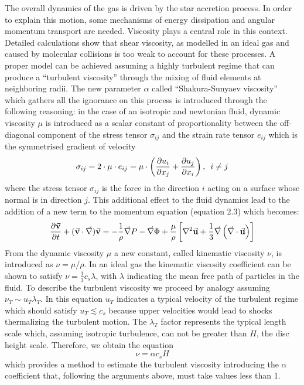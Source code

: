 \documentclass[a4paper,10pt]{report}
\begin{document}
The overall dynamics of the gas is driven by the star accretion process. In order to explain this motion, some mechanisms of energy dissipation and angular momentum transport
are needed. Viscosity plays a central role in this context. Detailed calculations show that shear viscosity, 
as modelled in an ideal gas and caused by molecular collisions is too weak to account for these processes. 
A proper model can be achieved assuming a highly turbulent regime that can produce a ``turbulent viscosity'' through the mixing of fluid elements
at neighboring radii. The new parameter $\alpha$
called ``Shakura-Sunyaev viscosity'' \citep{ssviscosity} which gathers all the ignorance on this process is introduced through the following reasoning:
in the case of an isotropic and newtonian fluid, dynamic viscosity $\mu$ is introduced as a scalar constant of 
proportionality between the off-diagonal component of the stress tensor $\sigma_{ij}$ and the strain rate tensor $e_{ij}$ which is the symmetrised gradient of velocity \citep{fluid}
\begin{equation}
    \sigma_{ij} = 2 \cdot \mu \cdot e_{ij} = \mu \cdot \left( \pdv{u_i}{x_j} + \pdv{u_j}{x_i} \right), \hspace{5pt} i \neq j
\end{equation}
where the stress tensor $\sigma_{ij}$ is the force in the direction $i$ acting on a surface whose
normal is in direction $j$.
This additional effect to the fluid dynamics lead to the addition of a new term to the momentum equation (equation 2.3) which becomes:
\begin{equation}
    \pdv{\va{v}}{t} + (\va{v}\cdot \va\nabla)\va{v} = -\frac{1}{\rho}\va  \nabla P - \va \nabla \Phi + \frac{\mu}{\rho}
    \left[ \nabla^2\va u + \frac 1 3 \va \nabla \left( \va \nabla \cdot \va u\right) \right]
\end{equation}
From the dynamic viscosity $\mu$ a new constant, called kinematic viscosity $\nu$, is introduced as $\nu=\mu/\rho$.
In an ideal gas the kinematic viscosity coefficient can be shown to satisfy $\nu = \frac{1}{3}c_s\lambda$,
with $\lambda$ indicating the mean free path of particles in the fluid.
To describe the turbulent viscosity we proceed by analogy assuming $\nu_T \sim u_T \lambda_T$. In this equation $u_T$ indicates a typical velocity of the turbulent regime
which should 
satisfy $u_T \lesssim c_s$ because upper velocities would lead to shocks thermalizing the turbulent motion.
The $\lambda_T$ factor 
represents the typical length scale which, assuming isotropic turbulence, can not be greater than $H$, the disc height scale.
Therefore, we obtain the equation
\begin{equation}
    \nu = \alpha c_s H
\end{equation}
which provides a method to estimate the turbulent viscosity introducing the $\alpha$ coefficient that, following the arguments above,
must take values less than 1.
\end{document}
